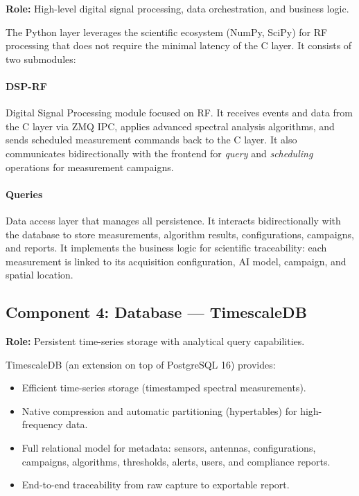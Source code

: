 \documentclass[12pt,a4paper]{article}
\begin{document}
\textbf{Role:} High-level digital signal processing, data orchestration, and business logic.

The Python layer leverages the scientific ecosystem (NumPy, SciPy) for RF processing that does not require the minimal latency of the C layer. It consists of two submodules:

\paragraph{DSP-RF}
Digital Signal Processing module focused on RF. It receives events and data from the C layer via ZMQ IPC, applies advanced spectral analysis algorithms, and sends scheduled measurement commands back to the C layer. It also communicates bidirectionally with the frontend for \textit{query} and \textit{scheduling} operations for measurement campaigns.

\paragraph{Queries}
Data access layer that manages all persistence. It interacts bidirectionally with the database to store measurements, algorithm results, configurations, campaigns, and reports. It implements the business logic for scientific traceability: each measurement is linked to its acquisition configuration, AI model, campaign, and spatial location.

\subsection{Component 4: Database --- TimescaleDB}

\textbf{Role:} Persistent time-series storage with analytical query capabilities.

TimescaleDB (an extension on top of PostgreSQL 16) provides:
\begin{itemize}
  \item Efficient time-series storage (timestamped spectral measurements).
  \item Native compression and automatic partitioning (hypertables) for high-frequency data.
  \item Full relational model for metadata: sensors, antennas, configurations, campaigns, algorithms, thresholds, alerts, users, and compliance reports.
  \item End-to-end traceability from raw capture to exportable report.
\end{itemize}
\end{document}
